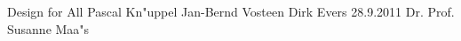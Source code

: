 \documentclass{header}
\begin{document}
        	{Design for All}
					{Pascal Kn"uppel}
					{Jan-Bernd Vosteen}
					{Dirk Evers}
					{28.9.2011}
					{Dr. Prof. Susanne Maa"s}
         
 \tableofcontents
 
\newpage
\pagestyle{fancy}
 \setcounter{page}{1}  



 
\end{document}
